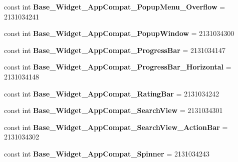 \begin{DoxyCompactItemize}
\item 
\hypertarget{classClient_1_1Droid_1_1Resource_1_1Style_ae063ff82c074962ec8858a6ba0017e98}{}const int {\bfseries Base\+\_\+\+Widget\+\_\+\+App\+Compat\+\_\+\+Popup\+Menu\+\_\+\+Overflow} = 2131034241\label{classClient_1_1Droid_1_1Resource_1_1Style_ae063ff82c074962ec8858a6ba0017e98}

\item 
\hypertarget{classClient_1_1Droid_1_1Resource_1_1Style_a506a4ffe8dc4b75abfb0c7395bb5a7ed}{}const int {\bfseries Base\+\_\+\+Widget\+\_\+\+App\+Compat\+\_\+\+Popup\+Window} = 2131034300\label{classClient_1_1Droid_1_1Resource_1_1Style_a506a4ffe8dc4b75abfb0c7395bb5a7ed}

\item 
\hypertarget{classClient_1_1Droid_1_1Resource_1_1Style_a7e4730f8b39de10613a4939e9957a09b}{}const int {\bfseries Base\+\_\+\+Widget\+\_\+\+App\+Compat\+\_\+\+Progress\+Bar} = 2131034147\label{classClient_1_1Droid_1_1Resource_1_1Style_a7e4730f8b39de10613a4939e9957a09b}

\item 
\hypertarget{classClient_1_1Droid_1_1Resource_1_1Style_aaae4b744d51babc8cb0cd40b6b2f85f6}{}const int {\bfseries Base\+\_\+\+Widget\+\_\+\+App\+Compat\+\_\+\+Progress\+Bar\+\_\+\+Horizontal} = 2131034148\label{classClient_1_1Droid_1_1Resource_1_1Style_aaae4b744d51babc8cb0cd40b6b2f85f6}

\item 
\hypertarget{classClient_1_1Droid_1_1Resource_1_1Style_a9303c971406cf28b347e1bb84c934f38}{}const int {\bfseries Base\+\_\+\+Widget\+\_\+\+App\+Compat\+\_\+\+Rating\+Bar} = 2131034242\label{classClient_1_1Droid_1_1Resource_1_1Style_a9303c971406cf28b347e1bb84c934f38}

\item 
\hypertarget{classClient_1_1Droid_1_1Resource_1_1Style_ac39ec12f891627d0302cbeb47e85d858}{}const int {\bfseries Base\+\_\+\+Widget\+\_\+\+App\+Compat\+\_\+\+Search\+View} = 2131034301\label{classClient_1_1Droid_1_1Resource_1_1Style_ac39ec12f891627d0302cbeb47e85d858}

\item 
\hypertarget{classClient_1_1Droid_1_1Resource_1_1Style_a9586f46f060d3087928620eec0711a08}{}const int {\bfseries Base\+\_\+\+Widget\+\_\+\+App\+Compat\+\_\+\+Search\+View\+\_\+\+Action\+Bar} = 2131034302\label{classClient_1_1Droid_1_1Resource_1_1Style_a9586f46f060d3087928620eec0711a08}

\item 
\hypertarget{classClient_1_1Droid_1_1Resource_1_1Style_a762bccc63c3cd89cb806fefa92088d35}{}const int {\bfseries Base\+\_\+\+Widget\+\_\+\+App\+Compat\+\_\+\+Spinner} = 2131034243\label{classClient_1_1Droid_1_1Resource_1_1Style_a762bccc63c3cd89cb806fefa92088d35}


\end{DoxyCompactItemize}
